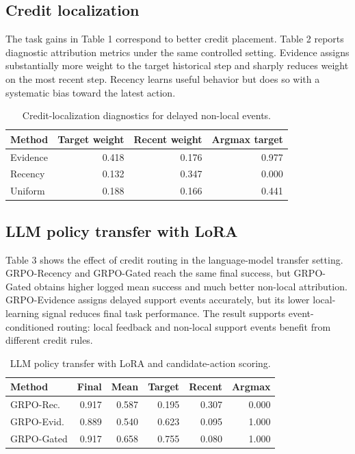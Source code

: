 \documentclass[letterpaper]{article} %
\begin{document}
\subsection{Credit localization}

The task gains in Table 1 correspond to better credit placement. Table 2 reports diagnostic attribution metrics under the same controlled setting. Evidence assigns substantially more weight to the target historical step and sharply reduces weight on the most recent step. Recency learns useful behavior but does so with a systematic bias toward the latest action.

\begin{table}[t]
\centering
\small
\caption{Credit-localization diagnostics for delayed non-local events.}
\label{tab:credit-diagnostics}
\begin{tabular}{lrrr}
\toprule
Method & Target weight & Recent weight & Argmax target \\
\midrule
Evidence & 0.418 & 0.176 & 0.977 \\
Recency & 0.132 & 0.347 & 0.000 \\
Uniform & 0.188 & 0.166 & 0.441 \\
\bottomrule
\end{tabular}
\end{table}

\subsection{LLM policy transfer with LoRA}

Table 3 shows the effect of credit routing in the language-model transfer setting. GRPO-Recency and GRPO-Gated reach the same final success, but GRPO-Gated obtains higher logged mean success and much better non-local attribution. GRPO-Evidence assigns delayed support events accurately, but its lower local-learning signal reduces final task performance. The result supports event-conditioned routing: local feedback and non-local support events benefit from different credit rules.

\begin{table}[t]
\centering
\scriptsize
\caption{LLM policy transfer with LoRA and candidate-action scoring.}
\label{tab:llm-lora-transfer}
\begin{tabular}{lrrrrr}
\toprule
Method & Final & Mean & Target & Recent & Argmax \\
\midrule
GRPO-Rec. & 0.917 & 0.587 & 0.195 & 0.307 & 0.000 \\
GRPO-Evid. & 0.889 & 0.540 & 0.623 & 0.095 & 1.000 \\
GRPO-Gated & 0.917 & 0.658 & 0.755 & 0.080 & 1.000 \\
\bottomrule
\end{tabular}
\end{table}
\end{document}
